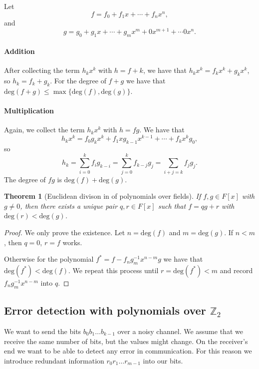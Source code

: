 \documentclass{article}
\newcommand{\Z}{\mathbb{Z}}
\newtheorem{theorem}{Theorem}
\begin{document}
Let 
\[
    f = f_0 + f_1 x + \cdots + f_n x^n,
\]
and
\[
    g = g_0 + g_1 x + \cdots + g_m x^m + 0x^{m+1} + \cdots 0x^n.
\]

\paragraph{Addition}
After collecting the term $h_k x^k$ with $h=f+k$, we have that $h_k x^k = f_k x^k + g_k x^k$, so $h_k = f_k + g_k$.
For the degree of $f+g$ we have that $\mathrm{deg}(f+g) \le \max \{ \mathrm{deg}(f), \mathrm{deg}(g) \}$.

\paragraph{Multiplication}
Again, we collect the term $h_k x^k$ with $h = fg$. We have that
\[
    h_k x^k = f_0 g_k x^k + f_1 x g_{k-1} x^{k-1} + \cdots + f_k x^k g_0,
\]
so
\[
    h_k = \sum_{i=0}^k f_i g_{k-i} = \sum_{j=0}^k f_{k-j} g_j = \sum_{i+j=k} f_j g_j.
\]
The degree of $fg$ is $\mathrm{deg}(f) + \mathrm{deg}(g)$.

\begin{theorem}[Euclidean divison in of polynomials over fields]
    If $f, g \in F[x]$ with $g \neq 0$, then there exists a unique pair $q,r \in F[x]$ such that $f = qg + r$ with $\mathrm{deg}(r) < \mathrm{deg}(g)$.
\end{theorem}
\begin{proof}
    We only prove the existence. Let $n = \mathrm{deg}(f)$ and $m = \mathrm{deg}(g)$. If $n < m$, then $q=0$, $r=f$ works.
    
    Otherwise for the polynomial $f^* = f - f_n g_m^{-1}x^{n-m} g$ we have that $\mathrm{deg}(f^*) < \mathrm{deg}(f)$.
    We repeat this process until $r = \mathrm{deg}(f^*) < m$ and record $f_n g_m^{-1}x^{n-m}$ into $q$.
\end{proof}

\subsection{Error detection with polynomials over $\Z_2$}

We want to send the bits $b_0 b_1 \ldots b_{k-1}$ over a noisy channel.
We assume that we receive the same number of bits, but the values might change.
On the receiver's end we want to be able to detect any error in communication.
For this reason we introduce redundant information $r_0 r_1 \ldots r_{m-1}$ into our bits.
\end{document}
